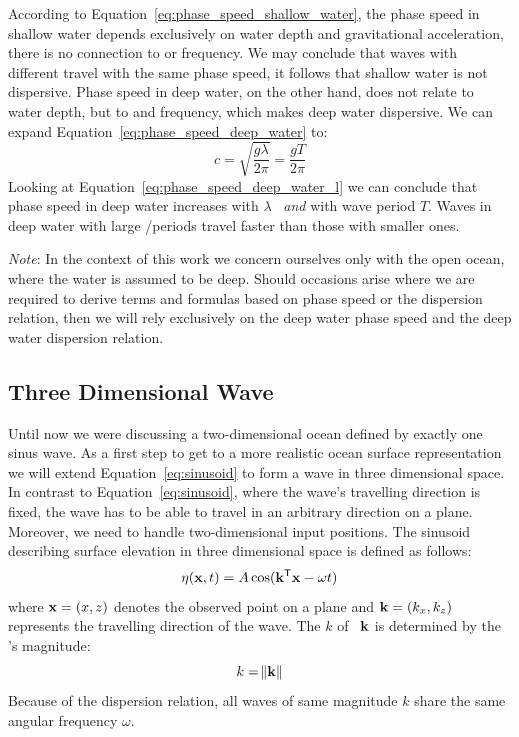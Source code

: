%
According to Equation~\ref{eq:phase_speed_shallow_water}, the phase speed in shallow water depends exclusively
on water depth and gravitational acceleration, there is no connection to \wavelength or frequency.
We may conclude that waves with different \wavelengths travel with the same phase speed, it follows that
shallow water is not dispersive. Phase speed in deep water, on the other hand,
does not relate to water depth, but to \wavelength and frequency, which makes deep water dispersive.
We can expand Equation~\ref{eq:phase_speed_deep_water} to:
%
\begin{equation}
\label{eq:phase_speed_deep_water_l}
 c = \sqrt{\frac{g\lambda}{2\pi}} = \frac{gT}{2\pi}
\end{equation}
%
Looking at Equation~\ref{eq:phase_speed_deep_water_l} we can conclude that phase speed in deep water increases
with \wavelength $\lambda$ ~\emph{and} with wave period $T$. Waves in deep water with large \wavelengths/periods
travel faster than those with smaller ones.

\emph{Note}: In the context of this work we concern ourselves only with the
open ocean, where the water is assumed to be deep. Should occasions arise where
we are required to derive terms and formulas based on phase speed or the
dispersion relation, then we will rely exclusively on the deep water phase speed
and the deep water dispersion relation.
%
\subsection{Three Dimensional Wave}
Until now we were discussing a two-dimensional ocean defined by exactly one sinus wave. As a first
step to get to a more realistic ocean surface representation we will extend Equation~\ref{eq:sinusoid}
to form a wave in three dimensional space. In contrast to Equation~\ref{eq:sinusoid}, where the wave's
travelling direction is fixed, the wave has to be able to travel in an arbitrary direction on a plane.
Moreover, we need to handle two-dimensional input positions. The sinusoid describing surface elevation
in three dimensional space is defined as follows:
\begin{equation}
\label{eq:sinusoid_3d}
 \eta(\mathbf{x}, t) = A\cos(\mathbf{k}^{\mathsf{T}}\mathbf{x} - \omega t)
\end{equation}
where $\mathbf{x} = (x, z)$ denotes the observed point on a plane and $\mathbf{k} = (k_x, k_z)$ represents
the travelling direction of the wave. The \wavenumber $k$ of~\emph{\wavevector} $\mathbf{k}$ is determined by
the \wavevector's magnitude:
\begin{equation*}
 k = \norm{\mathbf{k}}
\end{equation*}
Because of the dispersion relation, all waves of same magnitude $k$ share the
same angular frequency $\omega$.

